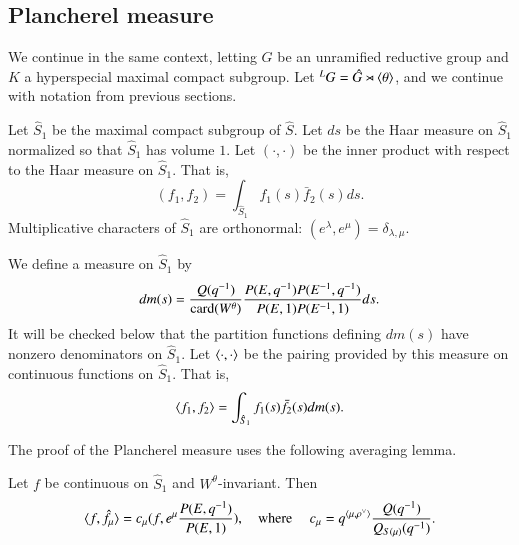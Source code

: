 \subsection{Plancherel measure}
We continue in the same context, letting
 $G$ be an unramified reductive group and  $K$ a hyperspecial maximal compact subgroup.
Let ${}^LG = \hat G\rtimes \langle{\theta}\rangle$, and we continue with notation from previous sections.

Let $\hat S_1$ be the maximal compact subgroup of $\hat S$.  Let $ds$ be the Haar measure on $\hat S_1$ normalized
so that $\hat S_1$ has volume $1$.
Let $(\cdot,\cdot)$ be the inner product with respect to the Haar  measure on $\hat S_1$. That is,
\begin{equation}
(f_1,f_2) = \int_{\hat S_1} f_1(s) \bar f_2(s) ds.
\end{equation}
Multiplicative characters of $\hat S_1$ are orthonormal: $(e^\lambda,e^\mu) = \delta_{\lambda,\mu}$.  


We define a measure on $\hat S_1$ by
\begin{equation}
dm(s) = \frac{Q(q^{-1})}{{\operatorname{card}}(W^\theta)}\frac{P(E,q^{-1}) P(E^{-1},q^{-1})}{P(E,1) P(E^{-1},1)} ds.
\end{equation}
It will be checked below that
the partition functions defining 
$dm(s)$
have nonzero  denominators on $\hat S_1$.
Let $\langle{\cdot,\cdot}\rangle$ be the pairing provided by this measure on continuous functions on $\hat S_1$.
That is, 
\begin{equation}
\langle{f_1,f_2}\rangle = \int_{\hat S_1} f_1(s) \bar f_2(s) dm(s).
\end{equation}



The proof of the Plancherel measure uses the following averaging lemma.

\begin{lemma}\label{lemma:average} 
Let $f$ be continuous on $\hat S_1$ and $W^\theta$-invariant.
Then
\[
\langle{f,\hat f_\mu}\rangle = c_\mu  (f, e^\mu\frac{ P(E,q^{-1})}{P(E,1)}),
\quad\text{where }\quad
c_\mu = q^{\langle{\mu,\rho^\vee}\rangle}\frac{ Q(q^{-1})}{Q_{S(\mu)}(q^{-1})}.
\]
\end{lemma}

